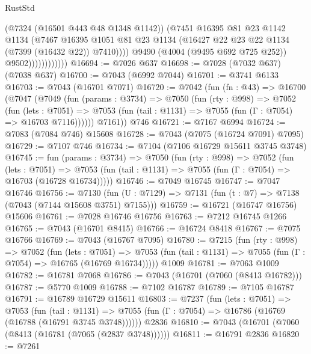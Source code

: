 \begin{lexlean}{RustStd}
\begin{coremodule}
                              (@7324 (@16501 @443 @48 @1348 @1142))
                              (@7451
                                @16395
                                @81
                                @23
                                @1142
                                @1134
                                (@7467
                                  @16395
                                  @1051
                                  @81
                                  @23
                                  @1134
                                  (@16427 @22 @23 @22 @1134 (@7399 (@16432 @22)) @7410))))
                            @9490
                            (@4004 (@9495 @692 @725 @252))
                            @9502))))))))))))
@16694 := @7026 @637
@16698 := @7028 (@7032 @637) (@7038 @637)
@16700 := @7043 (@6992 @7044)
@16701 := @3741 @6133
@16703 := @7043 (@16701 @7071)
@16720 := @7042
    (fun (fn : @43) =>
    @16700
      (@7047
        (@7049
          (fun (params : @3734) =>
          @7050
            (fun (rty : @998) =>
            @7052
              (fun (lets : @7051) =>
              @7053 (fun (tail : @1131) => @7055 (fun (Γ : @7054) => @16703 @7116))))))
        @7161))
    @746
@16721 := @7167 @6994
@16724 := @7083 (@7084 @746) @15608
@16728 := @7043 (@7075 (@16724 @7091) @7095)
@16729 := @7107 @746
@16734 := @7104 (@7106 @16729 @15611 @3745 @3748)
@16745 := fun (params : @3734) =>
  @7050
    (fun (rty : @998) =>
    @7052
      (fun (lets : @7051) =>
      @7053 (fun (tail : @1131) => @7055 (fun (Γ : @7054) => @16703 (@16728 @16734)))))
@16746 := @7049 @16745
@16747 := @7047 @16746
@16756 := @7130
    (fun (U : @7129) => @7131 (fun (t : @7) => @7138 (@7043 (@7144 @15608 @3751) @7155)))
@16759 := @16721 (@16747 @16756) @15606
@16761 := @7028 @16746 @16756
@16763 := @7212 @16745 @1266
@16765 := @7043 (@16701 @8415)
@16766 := @16724 @8418
@16767 := @7075 @16766
@16769 := @7043 (@16767 @7095)
@16780 := @7215
    (fun (rty : @998) =>
    @7052
      (fun (lets : @7051) =>
      @7053 (fun (tail : @1131) => @7055 (fun (Γ : @7054) => @16765 (@16769 @16734)))))
    @1009
@16781 := @7063 @1009
@16782 := @16781 @7068
@16786 := @7043 (@16701 (@7060 (@8413 @16782)))
@16787 := @5770 @1009
@16788 := @7102 @16787
@16789 := @7105 @16787
@16791 := @16789 @16729 @15611
@16803 := @7237
    (fun (lets : @7051) =>
    @7053
      (fun (tail : @1131) =>
      @7055 (fun (Γ : @7054) => @16786 (@16769 (@16788 (@16791 @3745 @3748))))))
    @2836
@16810 := @7043 (@16701 (@7060 (@8413 (@16781 (@7065 (@2837 @3748))))))
@16811 := @16791 @2836
@16820 := @7261

\end{coremodule}
\end{lexlean}
